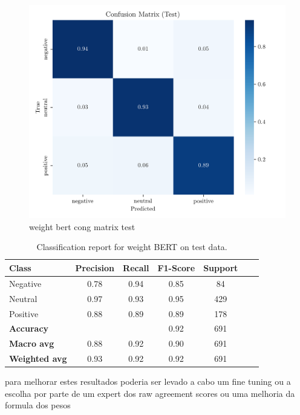 \documentclass[conference]{IEEEtran}
\begin{document}
\begin{figure}[H]
    \centering
    \includegraphics[width=1\linewidth]{assets/weighted_bert_confusion_matrix_Test.png}
    \caption{weight bert cong matrix test}
    \label{fig:weighted_bert_confusion_matrix_Test}
\end{figure}

\begin{table}[H]
\centering
\caption{Classification report for weight BERT on test data.}
\label{cr_augmbert_test}
\begin{tabular}{lcccccc}
\toprule
\textbf{Class} & \textbf{Precision} & \textbf{Recall} & \textbf{F1-Score} & \textbf{Support} \\
\midrule
Negative & 0.78 & 0.94 & 0.85 & 84 \\
Neutral & 0.97 & 0.93 & 0.95 & 429 \\
Positive & 0.88 & 0.89 & 0.89 & 178 \\
\midrule
\textbf{Accuracy} &  &  & 0.92 & 691 \\
\textbf{Macro avg} & 0.88 & 0.92 & 0.90 & 691 \\
\textbf{Weighted avg} & 0.93 & 0.92 & 0.92 & 691 \\
\bottomrule
\end{tabular}
\end{table}

para melhorar estes resultados poderia ser levado a cabo um fine tuning ou a escolha por parte de um expert dos raw agreement scores ou uma melhoria da formula dos pesos
\end{document}

